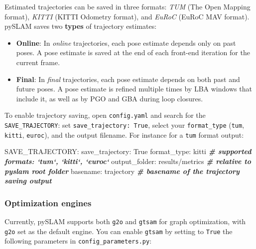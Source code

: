\documentclass{article}
\newenvironment{Shaded}{\begin{snugshade}}{\end{snugshade}}
\newcommand{\CommentTok}[1]{\textcolor[rgb]{0.00,0.40,1.00}{\textbf{\textit{#1}}}}
\newcommand{\ExtensionTok}[1]{\textcolor[rgb]{0.74,0.68,0.62}{#1}}
\newcommand{\NormalTok}[1]{\textcolor[rgb]{0.74,0.68,0.62}{#1}}
\providecommand{\tightlist}{%
  \setlength{\itemsep}{0pt}\setlength{\parskip}{0pt}}
\begin{document}
Estimated trajectories can be saved in three formats:
\emph{TUM} (The Open Mapping format), \emph{KITTI} (KITTI Odometry
format), and \emph{EuRoC} (EuRoC MAV format). pySLAM saves two
\textbf{types} of trajectory estimates:

\begin{itemize}
\tightlist
\item
  \textbf{Online}: In \emph{online} trajectories, each pose estimate
  depends only on past poses. A pose estimate is saved at the end of
  each front-end iteration for the current frame.
\item
  \textbf{Final}: In \emph{final} trajectories, each pose estimate
  depends on both past and future poses. A pose estimate is refined
  multiple times by LBA windows that include it, as well as by PGO and GBA during
  loop closures.
\end{itemize}

To enable trajectory saving, open \texttt{config.yaml} and search for
the \texttt{SAVE\_TRAJECTORY}: set \texttt{save\_trajectory:\ True},
select your \texttt{format\_type} (\texttt{tum}, \texttt{kitti},
\texttt{euroc}), and the output filename. For instance for a
\texttt{tum} format output: \\

\begin{scriptsize}
\begin{Shaded}
\begin{Highlighting}[]
\ExtensionTok{SAVE_TRAJECTORY}\NormalTok{:}
  \ExtensionTok{save_trajectory}\NormalTok{: True}
  \ExtensionTok{format_type}\NormalTok{: kitti             }\CommentTok{# supported formats: `tum`, `kitti`, `euroc`}
  \ExtensionTok{output_folder}\NormalTok{: results/metrics }\CommentTok{# relative to pyslam root folder }
  \ExtensionTok{basename}\NormalTok{: trajectory           }\CommentTok{# basename of the trajectory saving output}
\end{Highlighting}
\end{Shaded}
\end{scriptsize}

\hypertarget{optimization-engines}{%
\subsubsection{Optimization engines}\label{optimization-engines}}

Currently, pySLAM supports both \texttt{g2o} and \texttt{gtsam} for
graph optimization, with \texttt{g2o} set as the default engine. You can enable \texttt{gtsam} by setting to \texttt{True} the
following parameters in \texttt{config\_parameters.py}:
\end{document}
